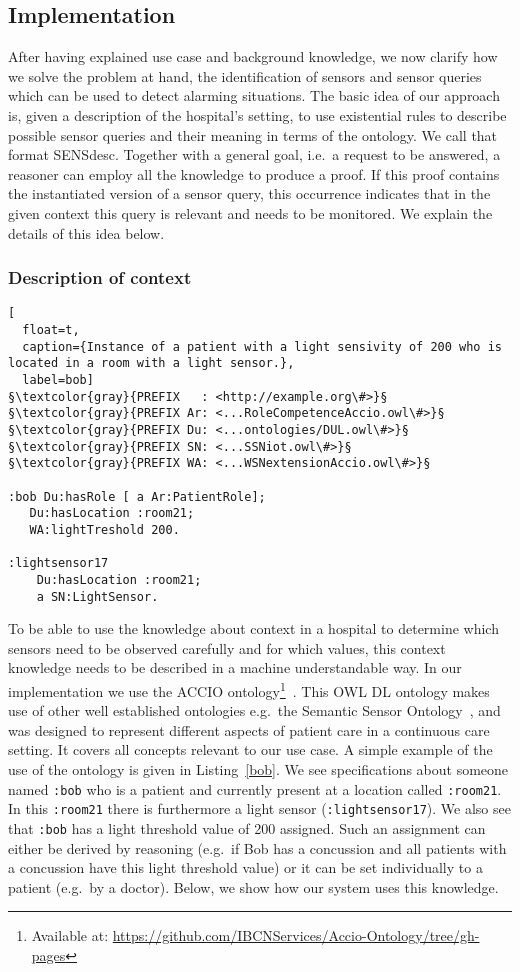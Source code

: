 \subsection{Implementation}\label{implementation}
After having explained use case and background knowledge, 
we now clarify how we solve the problem at hand, the identification of sensors and sensor queries which can be used to detect alarming situations. 
The basic idea of our approach is, given a description of the hospital's setting, to use existential rules  
to describe possible sensor queries and their meaning 
in terms of the ontology. We call that format SENSdesc. 
Together with a general goal, i.e.\ a request to be answered, 
a reasoner can employ all the knowledge to produce a proof. 
If this proof contains the instantiated version of a sensor query, this occurrence
indicates that in the given context this query is relevant  and needs to be monitored. 
We explain the details of this idea below. 

\subsubsection{Description of context}
\begin{lstlisting}[
  float=t,
  caption={Instance of a patient with a light sensivity of 200 who is located in a room with a light sensor.},
  label=bob]
§\textcolor{gray}{PREFIX   : <http://example.org\#>}§
§\textcolor{gray}{PREFIX Ar: <...RoleCompetenceAccio.owl\#>}§
§\textcolor{gray}{PREFIX Du: <...ontologies/DUL.owl\#>}§
§\textcolor{gray}{PREFIX SN: <...SSNiot.owl\#>}§
§\textcolor{gray}{PREFIX WA: <...WSNextensionAccio.owl\#>}§

:bob Du:hasRole [ a Ar:PatientRole];
   Du:hasLocation :room21;
   WA:lightTreshold 200.

:lightsensor17 
    Du:hasLocation :room21;
    a SN:LightSensor.
\end{lstlisting}
To be able to use the knowledge about context in a hospital to determine which sensors need to be observed carefully and for which values, this context knowledge needs 
to be described in a machine understandable way. In our implementation we use   
the ACCIO ontology\footnote{Available at: \url{https://github.com/IBCNServices/Accio-Ontology/tree/gh-pages}}~\cite{accioont}. 
This OWL DL ontology makes use of other well established ontologies e.g.\ the Semantic Sensor Ontology~\cite{ssn},
and was designed to represent different aspects of patient care in a continuous care setting. It covers all concepts relevant to our use case.
A simple example of the use of the ontology is given in Listing~\ref{bob}. We see specifications about someone named \texttt{:bob} who is a patient and currently present at 
a location called \texttt{:room21}. 
In this \texttt{:room21} there is furthermore a light sensor (\texttt{:lightsensor17}).
We also see that \texttt{:bob} has
a light threshold value
of 200 assigned. Such an assignment can either be derived by reasoning (e.g.\ if 
Bob has a concussion and all patients with a concussion have this light threshold value) or it can be set individually to a patient (e.g.\ by a doctor).
Below, we show how our system uses this knowledge.



